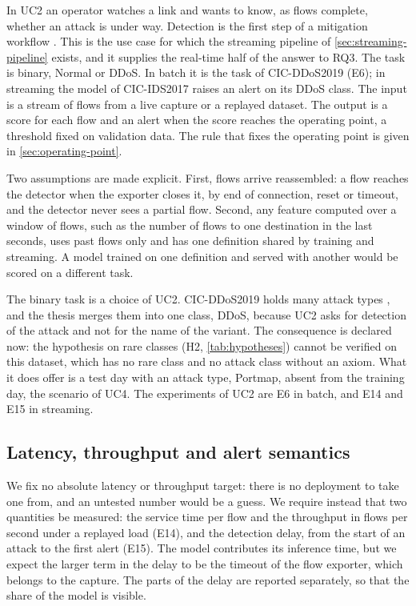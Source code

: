 In UC2 an operator watches a link and wants to know, as flows complete, whether an
attack is under way. Detection is the first step of a mitigation workflow
\citep{dobbins2021rfc8903}. This is the use case for which the streaming pipeline
of \cref{sec:streaming-pipeline} exists, and it supplies the real-time half of
the answer to RQ3. The task is binary, Normal or DDoS. In batch it is the task of
CIC-DDoS2019 (E6); in streaming the model of CIC-IDS2017 raises an alert on its DDoS
class. The input is a stream of
flows from a live capture or a replayed dataset. The output is a score for each
flow and an alert when the score reaches the operating point, a threshold fixed on
validation data.
The rule that fixes the operating point is given in \cref{sec:operating-point}.

Two assumptions are made explicit. First, flows arrive reassembled: a flow reaches
the detector when the exporter closes it, by end of connection, reset or timeout,
and the detector never sees a partial flow. Second, any feature computed over a
window of flows, such as the number of flows to one destination in the last
seconds, uses past flows only and has one definition shared by training and
streaming. A model trained on one definition and served with another would be
scored on a different task.

The binary task is a choice of UC2. CIC-DDoS2019 holds many attack types
\citep{cic2019ddos}, and the thesis merges them into one class, DDoS, because UC2
asks for detection of the attack and not for the name of the variant. The
consequence is declared now: the hypothesis on rare classes (H2, \cref{tab:hypotheses})
cannot be verified on this dataset, which has no rare class and no attack class
without an axiom. What it does
offer is a test day with an attack type, Portmap, absent from the training day,
the scenario of UC4. The experiments of UC2 are E6 in batch, and E14 and E15 in
streaming.

\subsection{Latency, throughput and alert semantics}
\label{sec:uc2-latency}

We fix no absolute latency or throughput target: there is no deployment to take
one from, and an untested number would be a guess. We require instead that two
quantities be measured: the service time per flow and the throughput in flows per
second under a replayed load (E14), and the detection delay, from the start of an
attack to the first alert (E15). The model contributes its inference time, but we
expect the larger term in the delay to be the timeout of the flow exporter, which
belongs to the capture. The parts of the delay are reported separately, so that the share
of the model is visible.

